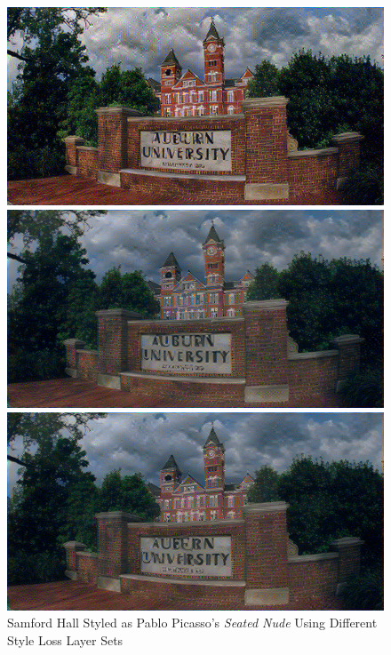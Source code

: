 \documentclass{article}
\begin{document}
\begin{figure}
\centering
\caption{Samford Hall Styled as Pablo Picasso's \textit{Seated Nude} Using
Different Style Loss Layer Sets}
\label{fig:style-layers-effect}

    \begin{minipage}{0.3\linewidth}
    \includegraphics[width=\textwidth]{img/style-layer-selection/block1_conv1}
    \end{minipage}
    \begin{minipage}{0.3\linewidth}
    \includegraphics[width=\textwidth]{img/style-layer-selection/block2_conv1}
    \end{minipage}
    \begin{minipage}{0.3\linewidth}
    \includegraphics[width=\textwidth]{img/style-layer-selection/block3_conv1}
    \end{minipage}


\end{figure}
\end{document}
